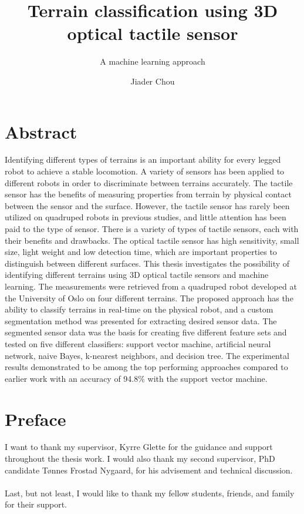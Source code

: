 \documentclass[USenglish]{ifimaster}  %
\title{Terrain classification using 3D optical tactile sensor}        %
\subtitle{A machine learning approach}
\date{}
\author{Jiader Chou}                      %
\begin{document}
	\ififorside{}
	\frontmatter{}
	\maketitle{}
	
	\frontmatter{}
\chapter*{Abstract}                   %
Identifying different types of terrains is an important ability for every legged robot to achieve a stable locomotion. A variety of sensors has been applied to different robots in order to discriminate between terrains accurately. The tactile sensor has the benefits of measuring properties from terrain by physical contact between the sensor and the surface. However, the tactile sensor has rarely been utilized on quadruped robots in previous studies, and little attention has been paid to the type of sensor. There is a variety of types of tactile sensors, each with their benefits and drawbacks. The optical tactile sensor has high sensitivity, small size, light weight and low detection time, which are important properties to distinguish between different surfaces. This thesis investigates the possibility of identifying different terrains using 3D optical tactile sensors and machine learning. The measurements were retrieved from a quadruped robot developed at the University of Oslo on four different terrains. The proposed approach has the ability to classify terrains in real-time on the physical robot, and a custom segmentation method was presented for extracting desired sensor data. The segmented sensor data was the basis for creating five different feature sets and tested on five different classifiers: support vector machine, artificial neural network, naive Bayes, k-nearest neighbors, and decision tree. The experimental results demonstrated to be among the top performing approaches compared to earlier work with an accuracy of 94.8\% with the support vector machine.



\tableofcontents{}
\listoffigures{}
\listoftables{}
	
\chapter*{Preface}                    %
I want to thank my supervisor, Kyrre Glette for the guidance and support throughout the thesis work. I would also thank my second supervisor, PhD candidate Tønnes Frostad Nygaard, for his advisement and technical discussion.
\\
\\
Last, but not least, I would like to thank my fellow students, friends, and family for their support.
\end{document}
